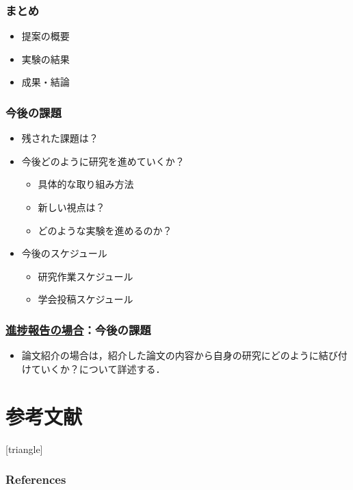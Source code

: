 \documentclass[dvipdfmx,cjk,t,10pt]{beamer}
\begin{document}
\begin{frame}
\frametitle{まとめ}

	\begin{itemize}
	\item 提案の概要
	\item 実験の結果
	\item 成果・結論
	\end{itemize}	
\end{frame}

\begin{frame}
\frametitle{今後の課題}
	\begin{itemize}
	\item 残された課題は？
	\item 今後どのように研究を進めていくか？
		\begin{itemize}	
		\item 具体的な取り組み方法
		\item 新しい視点は？
		\item どのような実験を進めるのか？
		\end{itemize}	
	\item 今後のスケジュール
		\begin{itemize}	
		\item 研究作業スケジュール
		\item 学会投稿スケジュール
		\end{itemize}				
	\end{itemize}	
\end{frame}

\begin{frame}
\frametitle{\underline{進捗報告の場合}：今後の課題}
	\begin{itemize}
	\item 論文紹介の場合は，紹介した論文の内容から自身の研究にどのように結び付けていくか？について詳述する．
	\end{itemize}	
\end{frame}

\section{参考文献}

\begin{frame}[allowframebreaks]
[triangle]
        \frametitle{References}
        
        
\end{frame}
\end{document}

